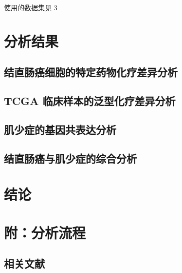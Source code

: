 \documentclass[
]{article}
\begin{document}
使用的数据集见 \ref{supp}

\hypertarget{results}{%
\section{分析结果}\label{results}}

\hypertarget{ux7ed3ux76f4ux80a0ux764cux7ec6ux80deux7684ux7279ux5b9aux836fux7269ux5316ux7597ux5deeux5f02ux5206ux6790}{%
\subsection{结直肠癌细胞的特定药物化疗差异分析}\label{ux7ed3ux76f4ux80a0ux764cux7ec6ux80deux7684ux7279ux5b9aux836fux7269ux5316ux7597ux5deeux5f02ux5206ux6790}}

\hypertarget{tcga-ux4e34ux5e8aux6837ux672cux7684ux6cdbux578bux5316ux7597ux5deeux5f02ux5206ux6790}{%
\subsection{TCGA 临床样本的泛型化疗差异分析}\label{tcga-ux4e34ux5e8aux6837ux672cux7684ux6cdbux578bux5316ux7597ux5deeux5f02ux5206ux6790}}

\hypertarget{ux808cux5c11ux75c7ux7684ux57faux56e0ux5171ux8868ux8fbeux5206ux6790}{%
\subsection{肌少症的基因共表达分析}\label{ux808cux5c11ux75c7ux7684ux57faux56e0ux5171ux8868ux8fbeux5206ux6790}}

\hypertarget{ux7ed3ux76f4ux80a0ux764cux4e0eux808cux5c11ux75c7ux7684ux7efcux5408ux5206ux6790}{%
\subsection{结直肠癌与肌少症的综合分析}\label{ux7ed3ux76f4ux80a0ux764cux4e0eux808cux5c11ux75c7ux7684ux7efcux5408ux5206ux6790}}

\hypertarget{dis}{%
\section{结论}\label{dis}}

\hypertarget{supp}{%
\section{附：分析流程}\label{supp}}

\hypertarget{ux76f8ux5173ux6587ux732e}{%
\subsection{相关文献}\label{ux76f8ux5173ux6587ux732e}}
\end{document}
